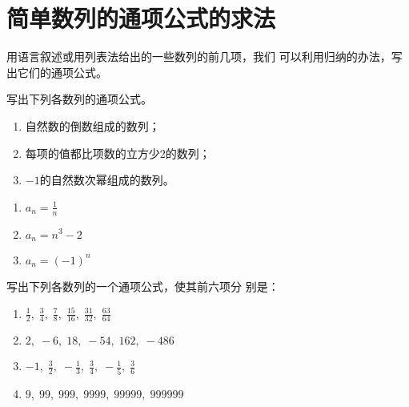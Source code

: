 \begin{center}
\end{center}

\section{简单数列的通项公式的求法}
用语言叙述或用列表法给出的一些数列的前几项，我们
可以利用归纳的办法，写出它们的通项公式。

\begin{example}
    写出下列各数列的通项公式。
\begin{enumerate}[(1)]
\item 自然数的倒数组成的数列；
\item 每项的值都比项数的立方少2的数列；
\item $-1$的自然数次幂组成的数列。
\end{enumerate}
\end{example}

\begin{solution}
\begin{multicols}{3}
  \begin{enumerate}[(1)]
    \item $a_n=\frac{1}{n}$
    \item $a_n=n^3-2$
    \item $a_n=(-1)^n$
\end{enumerate}  
\end{multicols}
\end{solution}

\begin{example}
    写出下列各数列的一个通项公式，使其前六项分
别是：
\begin{enumerate}[(1)]
\item  $\frac 12,\; \frac 34, \;\frac 78,\; \frac {15}{16} , \; \frac {31}{32} , \; \frac {63}{64}$
\item $2,\; -6,\; 18,\; -54,\; 162,\; -486$
\item $-1,\; \frac{3}{2},\; -\frac{1}{3},\; \frac{3}{4},\; -\frac{1}{5},\; \frac{3}{6}$
\item $9,\; 99,\; 999,\; 9999,\; 99999,\; 999999$
\end{enumerate}

\end{example}

